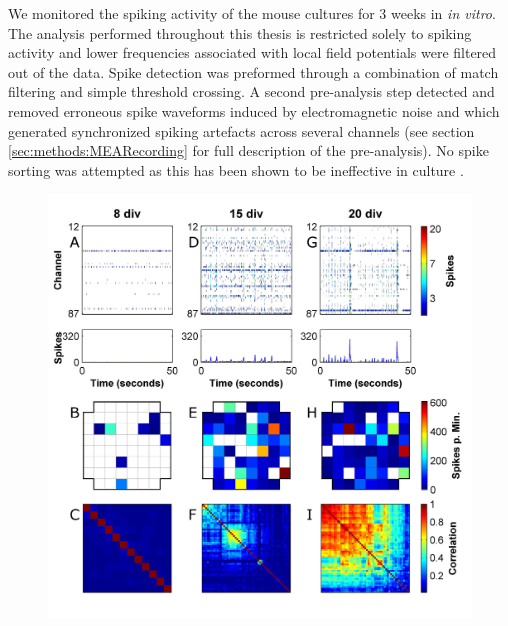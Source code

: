     We monitored the spiking activity of the mouse cultures for 3 weeks in \textit{in vitro}. The analysis performed throughout this thesis is restricted solely to spiking activity and lower frequencies associated with local field potentials were filtered out of the data. Spike detection was preformed through a combination of match filtering and simple threshold crossing. A second pre-analysis step detected and removed erroneous spike waveforms induced by electromagnetic noise and which generated synchronized spiking artefacts across several channels (see section \ref{sec:methods:MEARecording} for full description of the pre-analysis). No spike sorting was attempted as this has been shown to be ineffective in culture \cite{herzog2011optical}.

        \begin{figure}[!htb]
            \centering
            \includegraphics[width=15cm]{chapter3/figures/devExample/devActivity.jpg}


\end{figure}
